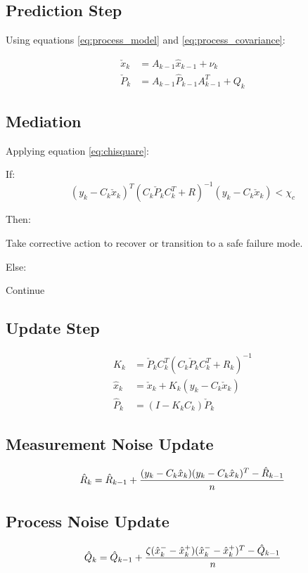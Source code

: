 \documentclass[a4paper]{article}
\begin{document}
	\subsection{Prediction Step}
	Using equations \ref{eq:process_model} and \ref{eq:process_covariance}:

	\begin{align*}
		\check{x}_k &= A_{k-1} \hat{x}_{k-1} + \nu_k\\
		\check{P}_k &= A_{k-1} \hat{P}_{k-1} A_{k-1}^T + Q_k
	\end{align*}

	\subsection{Mediation}
	Applying equation \ref{eq:chisquare}:

	If:
	\begin{equation*}
		(y_k - C_k \check{x}_k)^T (C_k \check{P}_k C_k^T + R)^{-1} (y_k - C_k \check{x}_k) < \chi_c
	\end{equation*}

	Then:
		\begin{center}
			Take corrective action to recover or transition to a safe failure mode.
		\end{center}

	Else:
		\begin{center}
			Continue
		\end{center}

	\subsection{Update Step}
	\begin{align*}
		K_k &=  \check{P}_k C_k^T (C_k \check{P}_k C_k^T + R_k)^{-1} \\
		\hat{x}_k &= \check{x}_k + K_k (y_k - C_k \check{x}_k) \\
		\hat{P}_k &= (I - K_k C_k) \check{P}_k
	\end{align*}

	\subsection{Measurement Noise Update}

	\begin{equation*}
		\hat{R}_k = \hat{R}_{k-1} + {(y_k - C_k \hat{x}_k)(y_k - C_k \hat{x}_k)^T - \hat{R}_{k-1} \over n}
	\end{equation*}

	\subsection{Process Noise Update}

	\begin{equation*}
		\hat{Q}_k = \hat{Q}_{k-1} + {\zeta (\hat{x}_k^- - \hat{x}_k^+)(\hat{x}_k^- - \hat{x}_k^+)^T - \hat{Q}_{k-1} \over n}
	\end{equation*}

\printbibliography[title={References}]
\end{document}
